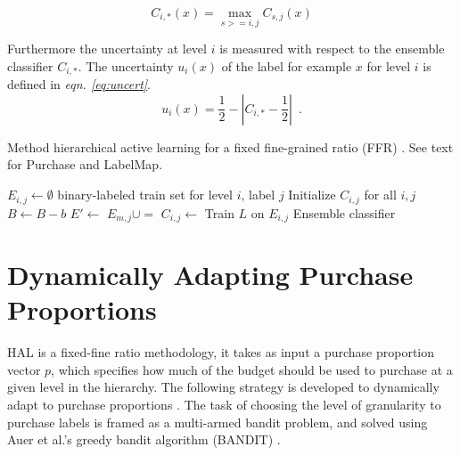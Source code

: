 \documentclass[ms]{nuthesis}
\begin{document}
\begin{equation}
\label{eq:maxcombine}
  C_{i,*}(x) = \max_{s>=i,j} C_{s,j}(x)
\end{equation}


Furthermore the uncertainty at level $i$
is measured with respect to the ensemble classifier $C_{i,*}$. The
uncertainty $u_i(x)$ of the label for example $x$ for level $i$ is defined
in \textit{eqn. \ref{eq:uncert}}.
\begin{equation}
\label{eq:uncert}
 u_i(x) = \frac{1}{2} - \left| C_{i,*} - \frac{1}{2} \right|
\enspace .
\end{equation}



\begin{algorithm}[!htb]
\small{
\caption{Method hierarchical active learning for a fixed
fine-grained ratio (FFR) \cite{yugi}.
See text for Purchase and LabelMap.
}
\label{alg:halalgo}
\begin{algorithmic}
\State  $E_{i,j} \gets \emptyset$  \Comment binary-labeled train set for
level $i$, label $j$
\State Initialize $C_{i,j}$ for all $i, j$
  \State $B \gets B-b$
    \State $E' \gets$ 
           \State $E_{m,j} \cup=$ 
       \EndFor
    \EndFor
  \EndFor
    \State $C_{i,j} \gets$ Train $L$ on $E_{i,j}$
  \EndFor
  \EndFor
\EndWhile
\State \Return Ensemble classifier
\EndFunction
\end{algorithmic}
}
\end{algorithm}

\section{Dynamically Adapting Purchase Proportions}
\label{sect:BANDIT}
HAL is a fixed-fine ratio methodology, it takes as input a purchase proportion
vector $p$, which specifies how much of the budget should be used to purchase at
a given level in the hierarchy. The following strategy is developed to
dynamically adapt to purchase proportions \cite{yugi}. The task of choosing the
level of granularity to purchase labels is framed as a multi-armed bandit problem,
and solved using Auer et al.'s greedy bandit algorithm (BANDIT) \cite{Auer2002}.
\end{document}
